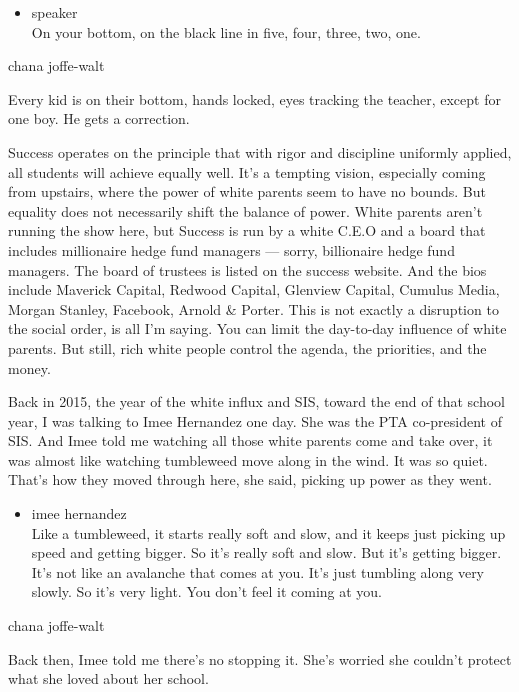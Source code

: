 \begin{itemize}
\tightlist
\item
  speaker\\
  On your bottom, on the black line in five, four, three, two, one.
\end{itemize}

chana joffe-walt

Every kid is on their bottom, hands locked, eyes tracking the teacher,
except for one boy. He gets a correction.

Success operates on the principle that with rigor and discipline
uniformly applied, all students will achieve equally well. It's a
tempting vision, especially coming from upstairs, where the power of
white parents seem to have no bounds. But equality does not necessarily
shift the balance of power. White parents aren't running the show here,
but Success is run by a white C.E.O and a board that includes
millionaire hedge fund managers --- sorry, billionaire hedge fund
managers. The board of trustees is listed on the success website. And
the bios include Maverick Capital, Redwood Capital, Glenview Capital,
Cumulus Media, Morgan Stanley, Facebook, Arnold \& Porter. This is not
exactly a disruption to the social order, is all I'm saying. You can
limit the day-to-day influence of white parents. But still, rich white
people control the agenda, the priorities, and the money.

Back in 2015, the year of the white influx and SIS, toward the end of
that school year, I was talking to Imee Hernandez one day. She was the
PTA co-president of SIS. And Imee told me watching all those white
parents come and take over, it was almost like watching tumbleweed move
along in the wind. It was so quiet. That's how they moved through here,
she said, picking up power as they went.

\begin{itemize}
\tightlist
\item
  imee hernandez\\
  Like a tumbleweed, it starts really soft and slow, and it keeps just
  picking up speed and getting bigger. So it's really soft and slow. But
  it's getting bigger. It's not like an avalanche that comes at you.
  It's just tumbling along very slowly. So it's very light. You don't
  feel it coming at you.
\end{itemize}

chana joffe-walt

Back then, Imee told me there's no stopping it. She's worried she
couldn't protect what she loved about her school.

